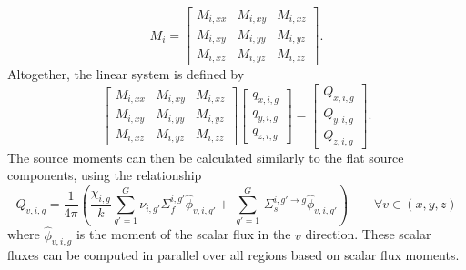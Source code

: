 \begin{equation}
M_i = 
\begin{bmatrix}
M_{i,xx} & M_{i,xy}  & M_{i,xz} \\
M_{i,xy} & M_{i,yy}  & M_{i,yz} \\
M_{i,xz} & M_{i,yz}  & M_{i,zz}
\end{bmatrix}.
\label{eq:linear-moment-matrix}
\end{equation}
Altogether, the linear system is defined by
\begin{equation}
\begin{bmatrix}
M_{i,xx} & M_{i,xy}  & M_{i,xz} \\
M_{i,xy} & M_{i,yy}  & M_{i,yz} \\
M_{i,xz} & M_{i,yz}  & M_{i,zz}
\end{bmatrix}
\begin{bmatrix}
q_{x,i,g} \\
q_{y,i,g} \\
q_{z,i,g}
\end{bmatrix}
=
\begin{bmatrix}
Q_{x,i,g} \\
Q_{y,i,g} \\
Q_{z,i,g}
\end{bmatrix}
.
\label{eq:moments-linear-sys}
\end{equation}
The source moments can then be calculated similarly to the flat source components, using the relationship
\begin{equation}
Q_{v,i,g} = \frac{1}{4 \pi} \left( \frac{\chi_{i,g}}{k} \sum_{g'=1}^{G} \nu_{i,g'} \Sigma_f^{i,g'} \hat{\phi}_{v,i,g'} + \, \sum_{g'=1}^G \,  \Sigma_{s}^{i,g' \rightarrow g} \hat{\phi}_{v,i,g'} \right) \qquad \forall v \in (x,y,z)
\end{equation}
where $\hat{\phi}_{v,i,g}$ is the moment of the scalar flux in the $v$ direction. These scalar fluxes can be computed in parallel over all regions based on scalar flux moments.


